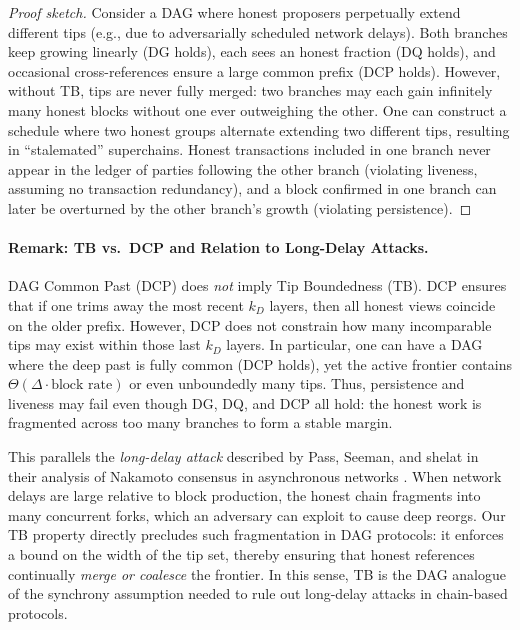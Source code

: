 \documentclass[11pt]{article}
\begin{document}
\begin{proof}[Proof sketch]
Consider a DAG where honest proposers perpetually extend different tips (e.g., due
to adversarially scheduled network delays). Both branches keep growing linearly
(DG holds), each sees an honest fraction (DQ holds), and occasional cross-references
ensure a large common prefix (DCP holds). However, without TB, tips are never fully
merged: two branches may each gain infinitely many honest blocks without one ever
outweighing the other. One can construct a schedule where two honest groups alternate
extending two different tips, resulting in ``stalemated'' superchains. Honest
transactions included in one branch never appear in the ledger of parties following
the other branch (violating liveness, assuming no transaction redundancy), and a
block confirmed in one branch can later be overturned by the other branch’s growth
(violating persistence).
\end{proof}

\paragraph{Remark: TB vs.\ DCP and Relation to Long-Delay Attacks.}
DAG Common Past (DCP) does \emph{not} imply Tip Boundedness (TB). DCP ensures that if one trims away the most recent $k_D$ layers, then all honest views coincide on the older prefix. However, DCP does not constrain how many incomparable tips may exist within those last $k_D$ layers. In particular, one can have a DAG where the deep past is fully common (DCP holds), yet the active frontier contains $\Theta(\Delta \cdot \text{block rate})$ or even unboundedly many tips. Thus, persistence and liveness may fail even though DG, DQ, and DCP all hold: the honest work is fragmented across too many branches to form a stable margin.

This parallels the \emph{long-delay attack} described by Pass, Seeman, and shelat in their analysis of Nakamoto consensus in asynchronous networks \cite[Section~8]{EC:PasSeeShe17}. When network delays are large relative to block production, the honest chain fragments into many concurrent forks, which an adversary can exploit to cause deep reorgs. Our TB property directly precludes such fragmentation in DAG protocols: it enforces a bound on the width of the tip set, thereby ensuring that honest references continually \emph{merge or coalesce} the frontier. In this sense, TB is the DAG analogue of the synchrony assumption needed to rule out long-delay attacks in chain-based protocols.
\end{document}
